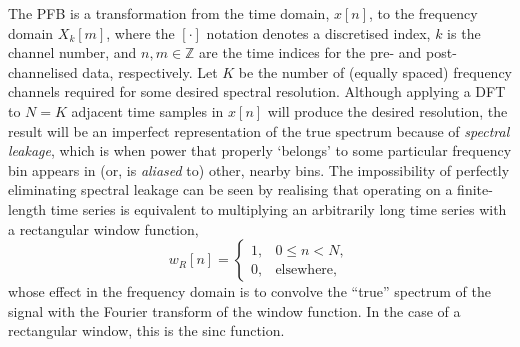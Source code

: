 \documentclass{pasa}%
\begin{document}
The PFB is a transformation from the time domain, $x[n]$, to the frequency domain $X_k[m]$, where the $[\cdot]$ notation denotes a discretised index, $k$ is the channel number, and $n,m \in \mathbb{Z}$ are the time indices for the pre- and post-channelised data, respectively.
Let $K$ be the number of (equally spaced) frequency channels required for some desired spectral resolution.
Although applying a DFT to $N = K$ adjacent time samples in $x[n]$ will produce the desired resolution, the result will be an imperfect representation of the true spectrum because of \textit{spectral leakage}, which is when power that properly `belongs' to some particular frequency bin appears in (or, is \textit{aliased} to) other, nearby bins.
The impossibility of perfectly eliminating spectral leakage can be seen by realising that operating on a finite-length time series is equivalent to multiplying an arbitrarily long time series with a rectangular window function,
\begin{equation}
    w_R[n] = \begin{cases} 1, & 0 \le n < N, \\ 0, & \text{elsewhere}, \end{cases}
\end{equation}
whose effect in the frequency domain is to convolve the ``true'' spectrum of the signal with the Fourier transform of the window function.
In the case of a rectangular window, this is the sinc function.
\end{document}

